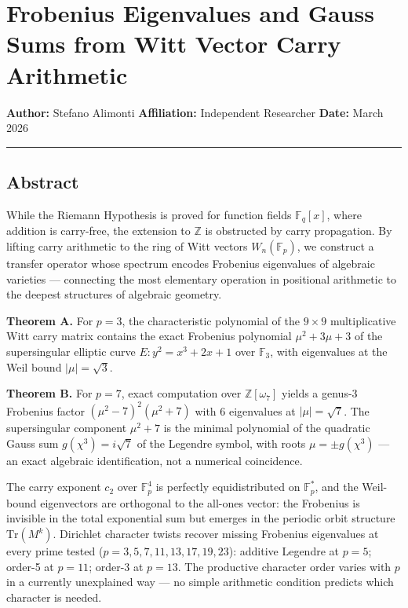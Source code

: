\documentclass[
  11pt,
]{article}
\author{Stefano Alimonti --- stefalimonti@gmail.com}
\date{March 2026}
\begin{document}
{
\hypersetup{linkcolor=black}
\setcounter{tocdepth}{2}
\tableofcontents
}
\section{Frobenius Eigenvalues and Gauss Sums from Witt Vector Carry
Arithmetic}\label{frobenius-eigenvalues-and-gauss-sums-from-witt-vector-carry-arithmetic}

\textbf{Author:} Stefano Alimonti \textbf{Affiliation:} Independent Researcher
\textbf{Date:} March 2026

\begin{center}\rule{0.5\linewidth}{0.5pt}\end{center}

\newpage

\subsection{Abstract}\label{abstract}

While the Riemann Hypothesis is proved for function fields \(\mathbb{F}_q[x]\),
where addition is carry-free, the extension to \(\mathbb{Z}\) is obstructed by
carry propagation. By lifting carry arithmetic to the ring of Witt vectors
\(W_n(\mathbb{F}_p)\), we construct a transfer operator whose spectrum encodes
Frobenius eigenvalues of algebraic varieties --- connecting the most elementary
operation in positional arithmetic to the deepest structures of algebraic
geometry.

\textbf{Theorem A.} For \(p = 3\), the characteristic polynomial of the
\(9 \times 9\) multiplicative Witt carry matrix contains the exact Frobenius
polynomial \(\mu^2 + 3\mu + 3\) of the supersingular elliptic curve
\(E: y^2 = x^3 + 2x + 1\) over \(\mathbb{F}_3\), with eigenvalues at the Weil
bound \(\lvert\mu\rvert = \sqrt{3}\).

\textbf{Theorem B.} For \(p = 7\), exact computation over
\(\mathbb{Z}[\omega_7]\) yields a genus-3 Frobenius factor
\((\mu^2 - 7)^2(\mu^2 + 7)\) with 6 eigenvalues at
\(\lvert\mu\rvert = \sqrt{7}\). The supersingular component \(\mu^2 + 7\) is the
minimal polynomial of the quadratic Gauss sum \(g(\chi^3) = i\sqrt{7}\) of the
Legendre symbol, with roots \(\mu = \pm g(\chi^3)\) --- an exact algebraic
identification, not a numerical coincidence.

The carry exponent \(c_2\) over \(\mathbb{F}_p^4\) is perfectly equidistributed
on \(\mathbb{F}_p^{\ast}\), and the Weil-bound eigenvectors are orthogonal to
the all-ones vector: the Frobenius is invisible in the total exponential sum but
emerges in the periodic orbit structure \(\mathrm{Tr}(M^k)\). Dirichlet
character twists recover missing Frobenius eigenvalues at every prime tested
(\(p = 3, 5, 7, 11, 13, 17, 19, 23\)): additive Legendre at \(p = 5\); order-5
at \(p = 11\); order-3 at \(p = 13\). The productive character order varies with
\(p\) in a currently unexplained way --- no simple arithmetic condition predicts
which character is needed.
\end{document}
